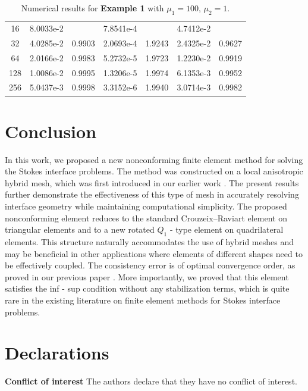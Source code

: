 \documentclass[a4paper,11pt,fleqn]{article}
\numberwithin{equation}{section}
\begin{document}
\begin{table}[H]
	\caption{Numerical results for \textbf{Example 1} with $\mu_1 = 100,\,\mu_2=1.$ } \label{tb:6.1.4}
	\begin{tabular}{c c c c c c c}
		\toprule
		\text{$\frac{1}{h}$}&
		\text{$\|p-p_h\|_{L^2(\Omega)}$}&
		\text{order}&
		\text{$\|\boldsymbol{u}-\boldsymbol{u}_h\|_{L^2(\Omega)}$}&
		\text{order}&
		\text{$|\boldsymbol{u}-\boldsymbol{u}_h|_{H^1(\Omega)}$}&
		\text{order}\\
		\midrule
		16 & 8.0033e-2 &  & 7.8541e-4 &  &  
		4.7412e-2 & \\
		32 & 4.0285e-2 & 0.9903 & 2.0693e-4 & 1.9243 & 
		2.4325e-2 & 0.9627\\
		64 & 2.0166e-2 & 0.9983 & 5.2732e-5 & 1.9723 & 
		1.2230e-2 & 0.9919\\
		128 & 1.0086e-2 & 0.9995 & 1.3206e-5 & 1.9974 & 
		6.1353e-3 & 0.9952\\
		256 & 5.0437e-3 & 0.9998 & 3.3152e-6 & 1.9940 &
		3.0714e-3 & 0.9982\\
		\bottomrule
	\end{tabular}
\end{table}
\section{Conclusion}\label{sec:conclusion}
In this work, we proposed a new nonconforming finite element method for solving the Stokes interface problems. The method was constructed on a local anisotropic hybrid mesh, which was first introduced in our earlier work \cite{Hu2021optimal}. The present results further demonstrate the effectiveness of this type of mesh in accurately resolving interface geometry while maintaining computational simplicity. The proposed nonconforming element reduces to the standard Crouzeix–Raviart element on triangular elements and to a new rotated $Q_1$ - type element on quadrilateral elements. This structure naturally accommodates the use of hybrid meshes and may be beneficial in other applications where elements of different shapes need to be effectively coupled. The consistency error is of optimal convergence order, as proved in our previous paper \cite{Wang2025nonconforming}. More importantly, we proved that this element satisfies the inf - sup condition without any stabilization terms, which is quite rare in the existing literature on finite element methods for Stokes interface problems. 

\section*{Declarations}
\textbf{Conflict of interest} The authors declare that they have no conflict of interest.

\end{document}
